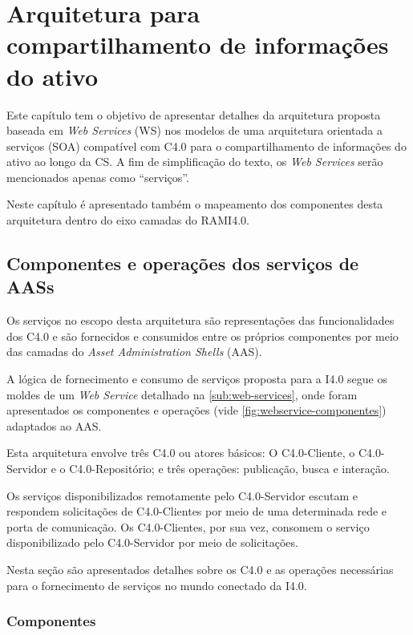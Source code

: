 \chapter{Arquitetura para compartilhamento de informações do ativo}
\label{cha:arquitetura}

Este capítulo tem o objetivo de apresentar detalhes da arquitetura proposta baseada em \textit{Web Services} (WS) nos modelos de uma arquitetura orientada a serviços (SOA) compatível com C4.0 para o compartilhamento de informações do ativo ao longo da CS. A fim de simplificação do texto, os \textit{Web Services} serão mencionados apenas como ``serviços''.

Neste capítulo é apresentado também o mapeamento dos componentes desta arquitetura dentro do eixo camadas do RAMI4.0.

\section{Componentes e operações dos serviços de AASs}
\label{sec:componentes-e-operacoes}

Os serviços no escopo desta arquitetura são representações das funcionalidades dos C4.0 e são fornecidos e consumidos entre os próprios componentes por meio das camadas do \textit{Asset Administration Shells} (AAS).

A lógica de fornecimento e consumo de serviços proposta para a I4.0 segue os moldes de um \textit{Web Service} detalhado na \autoref{sub:web-services}, onde foram apresentados os componentes e operações (vide \autoref{fig:webservice-componentes}) adaptados ao AAS.

Esta arquitetura envolve três C4.0 ou atores básicos: O C4.0-Cliente, o C4.0-Servidor e o C4.0-Repositório; e três operações: publicação, busca e interação.

Os serviços disponibilizados remotamente pelo C4.0-Servidor escutam e respondem solicitações de C4.0-Clientes por meio de uma determinada rede e porta de comunicação. Os C4.0-Clientes, por sua vez, consomem o serviço disponibilizado pelo C4.0-Servidor por meio de solicitações.

Nesta seção são apresentados detalhes sobre os C4.0 e as operações necessárias para o fornecimento de serviços no mundo conectado da I4.0.

\subsection{Componentes}

